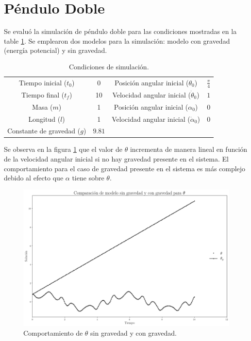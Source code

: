 \documentclass[12pt,letterpaper]{article}
\begin{document}
\section*{Péndulo Doble}

Se evaluó la simulación de péndulo doble para las condiciones mostradas en la table \ref{table: dp initial conditions}. Se emplearon dos modelos para la simulación: 
modelo con gravedad (energía potencial) y sin gravedad.


\begin{table}[h]
\begin{center}
\centering
\begin{tabular}{cccc}
\hline
Tiempo inicial ($t_0$) & 0  & Posición angular inicial ($\theta_0$) & $\frac{\pi}{4}$ \\
Tiempo final ($t_f$) & 10 & Velocidad angular inicial ($\dot{\theta}_0$)& $1$\\
Masa ($m$) & 1 &  Posición angular inicial ($\alpha_0$) & $0$\\
Longitud ($l$) & 1 & Velocidad angular inicial ($\dot{\alpha}_0$)& $0$\\
Constante de gravedad ($g$) & $9.81$ &  & \\
\hline
\end{tabular}
\end{center}
 \caption{Condiciones de simulación.}
 \label{table: dp initial conditions}
\end{table}

\pagebreak

Se observa en la figura \ref{fig: dp theta thetaG} que el valor de $\theta$ incrementa de manera lineal en función de la velocidad angular inicial si no hay gravedad presente en el sistema. 
El comportamiento para el caso de gravedad presente en el sistema es más complejo debido al efecto que $\alpha$ tiene sobre $\theta$.



\begin{figure}[h!]
 \centering
 \includegraphics[scale=0.2]{img/dp_theta_thetaG.png}
 \caption{Comportamiento de $\theta$ sin gravedad y con gravedad.}
 \label{fig: dp theta thetaG}
\end{figure}
\end{document}
